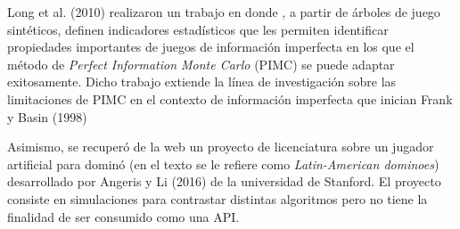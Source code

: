 Long et al. (2010) realizaron un trabajo en donde , a partir de árboles de juego
sintéticos, definen indicadores estadísticos que les permiten identificar
propiedades importantes de juegos de información imperfecta en los que el método
de \textit{Perfect Information Monte Carlo} (PIMC)  se puede adaptar
exitosamente. Dicho trabajo extiende la línea de investigación sobre las
limitaciones de PIMC en el contexto de información imperfecta que inician Frank
y Basin (1998)

Asimismo, se recuperó de la web un proyecto de licenciatura sobre un jugador
artificial para dominó (en el texto se le refiere como \textit{Latin-American
dominoes}) desarrollado por Angeris y Li (2016) de la universidad de Stanford.
El proyecto consiste en simulaciones para contrastar distintas algoritmos pero
no tiene la finalidad de ser consumido como una API.




